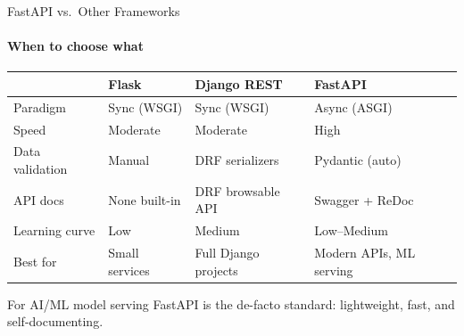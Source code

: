 \documentclass[aspectratio=169]{beamer}
\begin{document}
\begin{frame}[t]{FastAPI vs.~Other Frameworks}
\framesubtitle{When to choose what}
\vspace{-0.1cm}
\begin{center}
\footnotesize
\begin{tabular}{@{}p{2.7cm}p{3.3cm}p{3.3cm}p{3.3cm}@{}}
\toprule
 & \textbf{Flask} & \textbf{Django REST} & \textbf{FastAPI} \\
\midrule
Paradigm & Sync (WSGI) & Sync (WSGI) & Async (ASGI) \\
Speed & Moderate & Moderate & High \\
Data validation & Manual & DRF serializers & Pydantic (auto) \\
API docs & None built-in & DRF browsable API & Swagger + ReDoc \\
Learning curve & Low & Medium & Low--Medium \\
Best for & Small services & Full Django projects & Modern APIs, ML serving \\
\bottomrule
\end{tabular}
\end{center}
\vspace{3mm}
{For AI/ML model serving FastAPI is the de-facto standard: lightweight, fast, and self-documenting.}
\end{frame}
\end{document}

